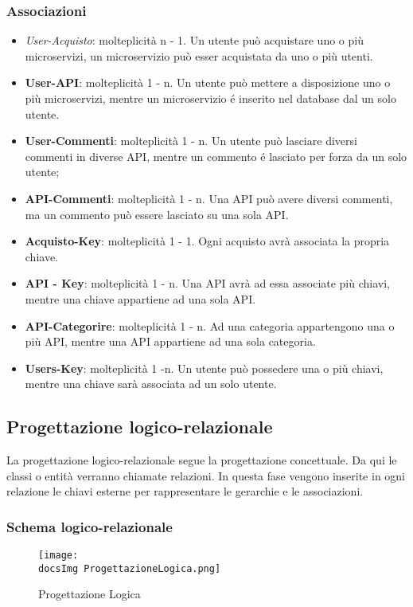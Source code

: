 {{		\subsubsection{Associazioni}
		\begin{itemize}
			\item\textit{User-Acquisto}: molteplicità n - 1. Un utente può acquistare uno o più microservizi, un microservizio può esser acquistata da uno o più utenti.
			\item\textbf{User-API}: molteplicità 1 - n. Un utente può mettere a disposizione uno o più microservizi, mentre un microservizio é inserito nel database dal un solo utente.
			\item\textbf{User-Commenti}: molteplicità 1 - n. Un utente può lasciare diversi commenti in diverse API, mentre un commento é lasciato per forza da un solo utente;
			\item\textbf{API-Commenti}: molteplicità 1 - n. Una API può avere diversi commenti, ma un commento può essere lasciato su una sola API.	
			\item\textbf{Acquisto-Key}: molteplicità 1 - 1. Ogni acquisto avrà associata la propria chiave. 
			\item\textbf{API - Key}: molteplicità 1 - n. Una API avrà ad essa associate più chiavi, mentre una chiave appartiene ad una sola API.
			\item\textbf{API-Categorire}: molteplicità 1 - n. Ad una categoria appartengono una o più API, mentre una API appartiene ad una sola categoria.
			\item\textbf{Users-Key}: molteplicità 1 -n. Un utente può possedere una o più chiavi, mentre una chiave sarà associata ad un solo utente.
		\end{itemize}				

	}
	\subsection{Progettazione logico-relazionale}{
		La progettazione logico-relazionale segue la progettazione concettuale. Da qui le classi o entità verranno chiamate relazioni. In questa fase vengono inserite in ogni relazione le chiavi esterne per rappresentare le gerarchie e le associazioni.
		\subsubsection{Schema logico-relazionale}
		\begin{figure}[ht]
			\centering
			\texttt{[image: \\docsImg ProgettazioneLogica.png]}
			\caption{Progettazione Logica}
			\label{Fig. Progettazione Logica}
		\end{figure}
}}
